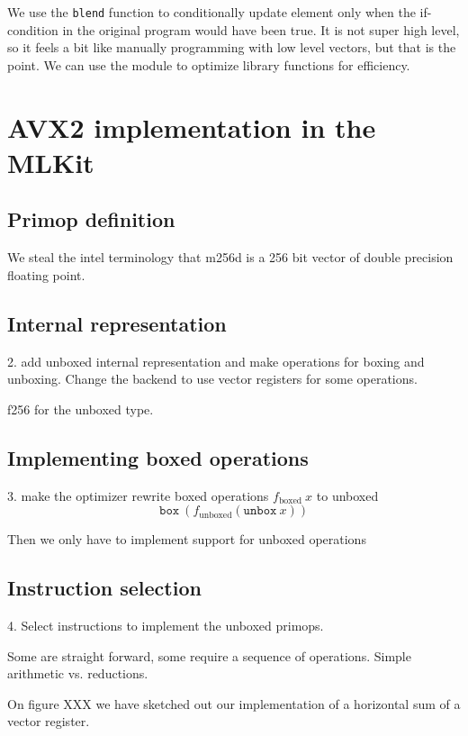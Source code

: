 \documentclass{article}
\begin{document}
We use the \verb!blend! function to conditionally update element only when the if-condition in the original program would have been true. It is not super high level, so it feels a bit like manually programming with low level vectors, but that is the point. We can use the module to optimize library functions for efficiency.

\section{AVX2 implementation in the MLKit}

\subsection{Primop definition}

We steal the intel terminology that m256d is a 256 bit vector of double precision floating point.

\subsection{Internal representation}

2. add unboxed internal representation and make operations for boxing and unboxing. Change the backend to use vector registers for some operations.

f256 for the unboxed type.

\subsection{Implementing boxed operations}

3. make the optimizer rewrite boxed operations $f_{\mathrm{boxed}}\ x$ to unboxed
\[
    \mathtt{box}\ (f_{\mathrm{unboxed}} (\mathtt{unbox}\ x))
\]

Then we only have to implement support for unboxed operations

\subsection{Instruction selection}

4. Select instructions to implement the unboxed primops.

Some are straight forward, some require a sequence of operations. Simple arithmetic vs. reductions.

On figure XXX we have sketched out our implementation of a horizontal sum of a vector register.
\end{document}

